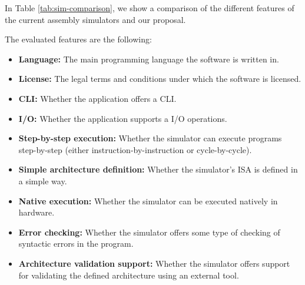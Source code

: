 In Table \ref{tab:sim-comparison}, we show a comparison of the different features of the current assembly simulators and our proposal.

The evaluated features are the following:
\begin{itemize}
  \item \textbf{Language:} The main \gls{programming language} the software is written in.
  \item \textbf{License:} The legal terms and conditions under which the software is licensed.
  \item \textbf{\gls{CLI}:} Whether the application offers a \gls{CLI}.
  \item \textbf{\gls{I/O}:} Whether the application supports a \gls{I/O} operations.
  \item \textbf{Step-by-step execution:} Whether the simulator can execute programs step-by-step (either instruction-by-instruction or cycle-by-cycle).
  \item \textbf{Simple architecture definition:} Whether the simulator's \gls{ISA} is defined in a simple way.
  \item \textbf{Native execution:} Whether the simulator can be executed natively in hardware.
  \item \textbf{Error checking:} Whether the simulator offers some type of checking of syntactic errors in the program.
  \item \textbf{Architecture validation support:} Whether the simulator offers support for validating the defined architecture using an external tool.
\end{itemize}

